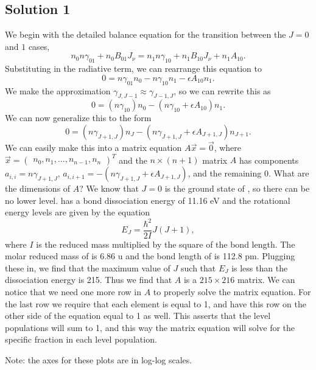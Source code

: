 \documentclass[11pt]{article}
\newenvironment{tight_enumerate}{
\begin{enumerate}[label=(\alph*)]
\setlength{\itemsep}{3pt}
\setlength{\parskip}{0pt}
}{\end{enumerate}}
\begin{document}
\subsection*{Solution 1}
\begin{tight_enumerate}
\item We begin with the detailed balance equation for the transition between the $J = 0$ and $1$ cases, 
\[n_{0}n\gamma_{01} + n_{0}B_{01}J_{\nu} = n_{1}n\gamma_{10} + n_{1}B_{10}J_{\nu} + n_{1}A_{10}.\] 
Substituting in the radiative term, we can rearrange this equation to 
\[0 = n\gamma_{01}n_{0} - n\gamma_{10}n_{1} - {\epsilon}A_{10}n_{1}.\] 
We make the approximation $\gamma_{J,J-1} \approx \gamma_{J-1,J}$, so we can rewrite this as 
\[0 = (n\gamma_{10})n_{0} - (n\gamma_{10} + {\epsilon}A_{10})n_{1}.\]
We can now generalize this to the form 
\[0 = (n\gamma_{J+1,J})n_{J} - (n\gamma_{J+1,J} + {\epsilon}A_{J+1,J})n_{J+1}.\] 
We can easily make this into a matrix equation $A\vec{x} = \vec{0}$, where $\vec{x} = \begin{pmatrix} n_{0}, n_{1}, ..., n_{n-1}, n_{n} \end{pmatrix}^{T}$ and the $n \times (n+1)$ matrix $A$ has components $a_{i,i} = n\gamma_{J+1,J}$, $a_{i,i+1} = -(n\gamma_{J+1,J}+{\epsilon}A_{J+1,J})$, and the remaining 0. What are the dimensions of $A$? We know that $J = 0$ is the ground state of , so there can be no lower level.  has a bond dissociation energy of 11.16 eV and the rotational energy levels are given by the equation 
\[E_{J} = \frac{\hbar^{2}}{2I}J(J+1),\] 
where $I$ is the reduced mass multiplied by the square of the bond length. The molar reduced mass of  is 6.86 \si{u} and the bond length of  is 112.8 \si{pm}. Plugging these in, we find that the maximum value of $J$ such that $E_{J}$ is less than the dissociation energy is 215. Thus we find that $A$ is a $215 \times 216$ matrix. We can notice that we need one more row in $A$ to properly solve the matrix equation. For the last row we require that each element is equal to 1, and have this row on the other side of the equation equal to 1 as well. This asserts that the level populations will sum to 1, and this way the matrix equation will solve for the specific fraction in each level population.
\item Note: the axes for these plots are in log-log scales.
\begin{figure}[H]
\vspace{-1em}
\centering

\end{figure}
\end{tight_enumerate}
\end{document}

